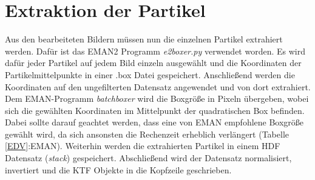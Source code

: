 \section{Extraktion der Partikel} %
\label{sec:extraktion_der_partikel}

Aus den bearbeiteten Bildern müssen nun die einzelnen Partikel extrahiert werden.
Dafür ist das EMAN2 Programm \textit{e2boxer.py} verwendet worden.
Es wird dafür jeder Partikel auf jedem Bild einzeln ausgewählt und die Koordinaten der Partikelmittelpunkte in einer .box Datei gespeichert.
Anschließend werden die Koordinaten auf den ungefilterten Datensatz angewendet und von dort extrahiert.
Dem EMAN-Programm \textit{batchboxer} wird die Boxgröße in Pixeln übergeben, wobei sich die gewählten Koordinaten im Mittelpunkt der quadratischen Box befinden.
Dabei sollte darauf geachtet werden, dass eine von EMAN empfohlene Boxgröße gewählt wird, da sich ansonsten die Rechenzeit erheblich verlängert (Tabelle \ref{EDV}:EMAN).
Weiterhin werden die extrahierten Partikel in einem HDF Datensatz (\textit{stack}) gespeichert.
Abschließend wird der Datensatz normalisiert, invertiert und die KTF Objekte in die Kopfzeile geschrieben.

\FloatBarrier